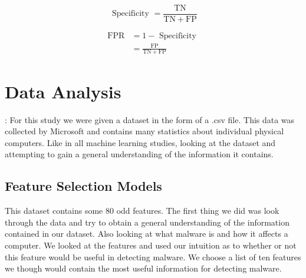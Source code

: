 \documentclass[sigconf]{acmart}
\begin{document}
\begin{equation}
\text { Specificity }=\frac{\text { TN }}{\mathrm{TN}+\mathrm{FP}}
\end{equation}

\begin{equation}
\begin{aligned} \mathrm{FPR} &=1-\text { Specificity } \\ &=\frac{\mathrm{FP}}{\mathrm{TN}+\mathrm{FP}} \end{aligned}
\end{equation}
 
\section{Data Analysis}:
For this study we were given a dataset in the form of a .csv file. This data was collected by Microsoft and contains many statistics about individual physical computers. Like in all machine learning studies, looking at the dataset and attempting to gain a general understanding of the information it contains. 
\subsection{Feature Selection Models}
This dataset contains some 80 odd features. The first thing we did was look through the data and try to obtain a general understanding of the information contained in our dataset. Also looking at what malware is and how it affects a computer. We looked at the features and used our intuition as to whether or not this feature would be useful in detecting malware. We choose a list of ten features we though would contain the most useful information for detecting malware. 
\end{document}
